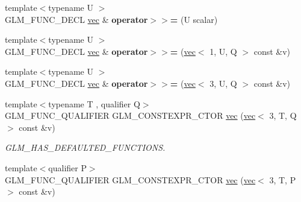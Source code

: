 \begin{DoxyCompactItemize}
\item 
\mbox{\label{structglm_1_1vec_3_013_00_01T_00_01Q_01_4_af6fe1a33a28847e310e829a9543143f7}} 
{\footnotesize template$<$typename U $>$ }\\G\+L\+M\+\_\+\+F\+U\+N\+C\+\_\+\+D\+E\+CL \hyperlink{structglm_1_1vec}{vec} \& {\bfseries operator$>$$>$=} (U scalar)
\item 
\mbox{\label{structglm_1_1vec_3_013_00_01T_00_01Q_01_4_a6b9d6604ed427e6098aa136ea98be7dd}} 
{\footnotesize template$<$typename U $>$ }\\G\+L\+M\+\_\+\+F\+U\+N\+C\+\_\+\+D\+E\+CL \hyperlink{structglm_1_1vec}{vec} \& {\bfseries operator$>$$>$=} (\hyperlink{structglm_1_1vec}{vec}$<$ 1, U, Q $>$ const \&v)
\item 
\mbox{\label{structglm_1_1vec_3_013_00_01T_00_01Q_01_4_a2f52f05d54329e0dddf515de1f2b32be}} 
{\footnotesize template$<$typename U $>$ }\\G\+L\+M\+\_\+\+F\+U\+N\+C\+\_\+\+D\+E\+CL \hyperlink{structglm_1_1vec}{vec} \& {\bfseries operator$>$$>$=} (\hyperlink{structglm_1_1vec}{vec}$<$ 3, U, Q $>$ const \&v)
\item 
\mbox{\label{structglm_1_1vec_3_013_00_01T_00_01Q_01_4_a9403cc63719b575a9a136e9de99593e4}} 
{\footnotesize template$<$typename T , qualifier Q$>$ }\\G\+L\+M\+\_\+\+F\+U\+N\+C\+\_\+\+Q\+U\+A\+L\+I\+F\+I\+ER G\+L\+M\+\_\+\+C\+O\+N\+S\+T\+E\+X\+P\+R\+\_\+\+C\+T\+OR \hyperlink{structglm_1_1vec_3_013_00_01T_00_01Q_01_4_a9403cc63719b575a9a136e9de99593e4}{vec} (\hyperlink{structglm_1_1vec}{vec}$<$ 3, T, Q $>$ const \&v)
\begin{DoxyCompactList}\small\item\em G\+L\+M\+\_\+\+H\+A\+S\+\_\+\+D\+E\+F\+A\+U\+L\+T\+E\+D\+\_\+\+F\+U\+N\+C\+T\+I\+O\+NS. \end{DoxyCompactList}\item 
\mbox{\label{structglm_1_1vec_3_013_00_01T_00_01Q_01_4_a16d0432ba5cb3aaef5e3657b8bf1c889}} 
{\footnotesize template$<$qualifier P$>$ }\\G\+L\+M\+\_\+\+F\+U\+N\+C\+\_\+\+Q\+U\+A\+L\+I\+F\+I\+ER G\+L\+M\+\_\+\+C\+O\+N\+S\+T\+E\+X\+P\+R\+\_\+\+C\+T\+OR \hyperlink{structglm_1_1vec_3_013_00_01T_00_01Q_01_4_a16d0432ba5cb3aaef5e3657b8bf1c889}{vec} (\hyperlink{structglm_1_1vec}{vec}$<$ 3, T, P $>$ const \&v)

\end{DoxyCompactItemize}
